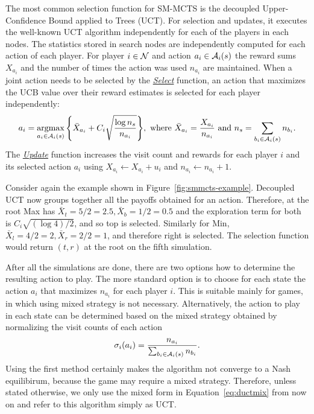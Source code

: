 The most common selection function for SM-MCTS is the decoupled Upper-Confidence Bound applied to Trees (UCT).
For selection and updates, it executes the well-known UCT \cite{UCT} algorithm independently for each of the players in each nodes.
The statistics stored in search nodes are independently computed for each action of each player. For player $i\in \mathcal{N}$ and 
action $a_i \in \mathcal{A}_i(s)$ the reward sums $X_{a_i}$ and the number of times the action was used $n_{a_i}$ are maintained.
When a joint action needs to be selected by the \emph{\underline{Select}} function, an action that maximizes the UCB value over 
their reward estimates is selected for each player independently:
\begin{equation}
a_i = \argmax_{a_i \in \cA_i(s)}{ \left\{ \bar{X}_{a_i} + C_i \sqrt{\frac{\log n_s}{n_{a_i}}} \right\} },
  \mbox{ where } \bar{X}_{a_i} = \frac{X_{a_i}}{n_{a_i}} \mbox{ and } n_s=\sum_{b_i \in \cA_i(s)} n_{b_i}.\label{eq:uct}
\end{equation}
\noindent The \emph{\underline{Update}} function increases the visit count and rewards for each player $i$ and its selected action $a_i$ using $X_{a_i} \leftarrow X_{a_i} + u_i$
and $n_{a_i} \leftarrow n_{a_i} + 1$.

Consider again the example shown in Figure~\ref{fig:smmcts-example}. Decoupled UCT now groups together all the payoffs obtained 
for an action. Therefore, at the root Max has $\bar{X}_t = 5/2 = 2.5, \bar{X}_b = 1/2 = 0.5$ and the exploration term for both is 
$C_i \sqrt{(\log 4) / 2}$, and so top is selected. Similarly for Min, $\bar{X}_l = 4/2 = 2, \bar{X}_r = 2/2 = 1$, and
therefore right is selected. The selection function would return $(t,r)$ at the root on the fifth simulation. 

After all the simulations are done, there are two options how to determine the resulting action to play.
The more standard option is to choose for each state the action $a_i$ that maximizes $n_{a_i}$ for each player $i$.
This is suitable mainly for games, in which using mixed strategy is not necessary.
Alternatively, the action to play in each state can be determined based on the mixed strategy obtained by normalizing the visit counts of each action 
\begin{equation}
\sigma_i(a_i) = \frac{n_{a_i}}{\sum_{b_i\in \mathcal{A}_i(s)} n_{b_i}}.
\label{eq:ductmix}
\end{equation}
Using the first method certainly makes the algorithm not converge to a Nash equilibirum, because the game may require a mixed strategy.
Therefore, unless stated otherwise, we only use the mixed form in Equation~\ref{eq:ductmix} from now on and refer to this algorithm simply as UCT.

